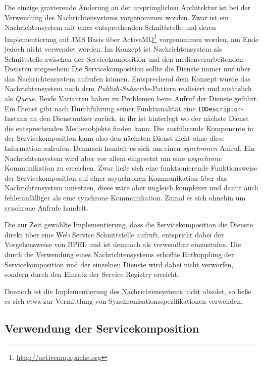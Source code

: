   Die einzige gravierende Änderung an der ursprünglichen Architektur ist bei der Verwendung des Nachrichtensystems vorgenommen worden. Zwar ist ein Nachrichtensystem mit einer entsprechenden Schnittstelle und deren Implementierung auf JMS Basis über ActiveMQ\footnote{\url{http://activemq.apache.org}} vorgenommen worden, am Ende jedoch nicht verwendet worden. Im Konzept ist Nachrichtensystem als Schnittstelle zwischen der Servicekomposition und den medienverarbeitenden Diensten vorgesehen: Die Servicekomposition sollte die Dienste immer nur über das Nachrichtensystem aufrufen können. Entsprechend dem Konzept wurde das Nachrichtensystem nach dem \emph{Publish-Subscribe}-Pattern realisiert und zusätzlich als \emph{Queue}. Beide Varianten haben zu Problemen beim Aufruf der Dienste geführt. Ein Dienst gibt nach Durchführung seiner Funktionalität eine \verb!IODescriptor!-Instanz an den Dienstnutzer zurück, in ihr ist hinterlegt wo der nächste Dienst die entsprechenden Medienobjekte finden kann. Die ausführende Komponente in der Servicekomposition kann also den nächsten Dienst nicht ohne diese Information aufrufen. Demnach handelt es sich um einen \emph{synchronen} Aufruf. Ein Nachrichtensystem wird aber vor allem eingesetzt um eine \emph{asynchrone} Kommunikation zu erreichen. Zwar ließe sich eine funktionierende Funktionsweise der Servicekomposition auf einer asynchronen Kommunikation über das Nachrichtensystem umsetzen, diese wäre aber ungleich komplexer und damit auch fehleranfälliger als eine synchrone Kommunikation. Zumal es sich ohnehin um synchrone Aufrufe handelt.
  
  Die zur Zeit gewählte Implementierung, dass die Servicekomposition die Dienste direkt über eine Web Service Schnittstelle aufruft, entspricht dabei der Vorgehensweise von BPEL und ist demnach als verwendbar einzustufen. Die durch die Verwendung eines Nachrichtensystems erhoffte Entkopplung der Servicekomposition und der einzelnen Dienste wird dabei nicht verworfen, sondern durch den Einsatz der Service Registry erreicht.
  
  Dennoch ist die Implementierung des Nachrichtensystems nicht obsolet, so ließe es sich etwa zur Vermittlung von Synchronisationsspezifikationen verwenden.


\subsection{Verwendung der Servicekomposition} %
\label{sub:verwendung_der_servicekomposition}

